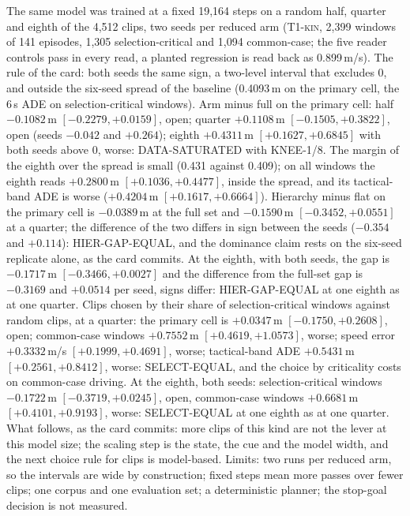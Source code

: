 \documentclass[10pt,twocolumn]{article}
\makeatletter
\theoremstyle{remark}
\newcommand{\tier}[1]{\textsc{\small #1}}
\renewcommand\paragraph{\@startsection{paragraph}{4}{\z@}{1.6ex \@plus .5ex \@minus .2ex}{-1em}{\normalfont\normalsize\bfseries}}
\makeatother
\begin{document}
\paragraph{Data efficiency (final read, six baseline seeds).} The same model was trained at a fixed 19,164 steps on a random half, quarter and eighth of the 4,512 clips, two seeds per reduced arm (\tier{T1-kin}, 2,399 windows of 141 episodes, 1,305 selection-critical and 1,094 common-case; the five reader controls pass in every read, a planted regression is read back as 0.899\,m/s). The rule of the card: both seeds the same sign, a two-level interval that excludes 0, and outside the six-seed spread of the baseline (0.4093\,m on the primary cell, the 6\,s ADE on selection-critical windows). Arm minus full on the primary cell: half $-0.1082$\,m $[-0.2279,+0.0159]$, open; quarter $+0.1108$\,m $[-0.1505,+0.3822]$, open (seeds $-0.042$ and $+0.264$); eighth $+0.4311$\,m $[+0.1627,+0.6845]$ with both seeds above 0, worse: DATA-SATURATED with KNEE-1/8. The margin of the eighth over the spread is small (0.431 against 0.409); on all windows the eighth reads $+0.2800$\,m $[+0.1036,+0.4477]$, inside the spread, and its tactical-band ADE is worse ($+0.4204$\,m $[+0.1617,+0.6664]$). Hierarchy minus flat on the primary cell is $-0.0389$\,m at the full set and $-0.1590$\,m $[-0.3452,+0.0551]$ at a quarter; the difference of the two differs in sign between the seeds ($-0.354$ and $+0.114$): HIER-GAP-EQUAL, and the dominance claim rests on the six-seed replicate alone, as the card commits. At the eighth, with both seeds, the gap is $-0.1717$\,m $[-0.3466,+0.0027]$ and the difference from the full-set gap is $-0.3169$ and $+0.0514$ per seed, signs differ: HIER-GAP-EQUAL at one eighth as at one quarter. Clips chosen by their share of selection-critical windows against random clips, at a quarter: the primary cell is $+0.0347$\,m $[-0.1750,+0.2608]$, open; common-case windows $+0.7552$\,m $[+0.4619,+1.0573]$, worse; speed error $+0.3332$\,m/s $[+0.1999,+0.4691]$, worse; tactical-band ADE $+0.5431$\,m $[+0.2561,+0.8412]$, worse: SELECT-EQUAL, and the choice by criticality costs on common-case driving. At the eighth, both seeds: selection-critical windows $-0.1722$\,m $[-0.3719,+0.0245]$, open, common-case windows $+0.6681$\,m $[+0.4101,+0.9193]$, worse: SELECT-EQUAL at one eighth as at one quarter. What follows, as the card commits: more clips of this kind are not the lever at this model size; the scaling step is the state, the cue and the model width, and the next choice rule for clips is model-based. Limits: two runs per reduced arm, so the intervals are wide by construction; fixed steps mean more passes over fewer clips; one corpus and one evaluation set; a deterministic planner; the stop-goal decision is not measured.
\end{document}
